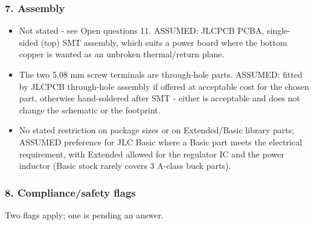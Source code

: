 \documentclass[11pt,a4paper]{article}
\begin{document}
\subsubsection*{7. Assembly}
\begin{itemize}
\item Not stated - see Open questions 11. ASSUMED: JLCPCB PCBA, single-sided
(top) SMT assembly, which suits a power board where the bottom copper
is wanted as an unbroken thermal/return plane.
\item The two 5.08 mm screw terminals are through-hole parts. ASSUMED: fitted
by JLCPCB through-hole assembly if offered at acceptable cost for the
chosen part, otherwise hand-soldered after SMT - either is acceptable
and does not change the schematic or the footprint.
\item No stated restriction on package sizes or on Extended/Basic library
parts; ASSUMED preference for JLC Basic where a Basic part meets the
electrical requirement, with Extended allowed for the regulator IC and
the power inductor (Basic stock rarely covers 3 A-class buck parts).
\end{itemize}
\subsubsection*{8. Compliance/safety flags}
Two flags apply; one is pending an answer.
\end{document}
